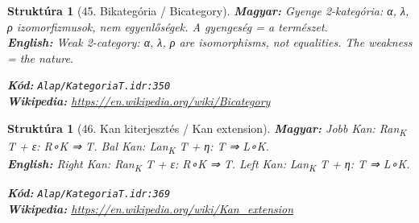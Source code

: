\documentclass[11pt,a4paper,twocolumn]{article}
\newtheorem{struktura}[tetel]{Struktúra}
\begin{document}
\begin{struktura}[45. Bikategória / Bicategory]

\textbf{Magyar:} Gyenge 2-kategória: α, λ, ρ izomorfizmusok, nem egyenlőségek. A gyengeség = a természet.\\

\textbf{English:} Weak 2-category: α, λ, ρ are isomorphisms, not equalities. The weakness = the nature.\\

\begin{center}
\end{center}

\textbf{Kód:} \texttt{Alap/KategoriaT.idr:350}\\
\textbf{Wikipedia:} \url{https://en.wikipedia.org/wiki/Bicategory}

\end{struktura}

\vspace{0.5cm}

\begin{struktura}[46. Kan kiterjesztés / Kan extension]

\textbf{Magyar:} Jobb Kan: Ran\textsubscript{K} T + ε: R∘K ⇒ T. Bal Kan: Lan\textsubscript{K} T + η: T ⇒ L∘K.\\

\textbf{English:} Right Kan: Ran\textsubscript{K} T + ε: R∘K ⇒ T. Left Kan: Lan\textsubscript{K} T + η: T ⇒ L∘K.\\

\begin{center}
\end{center}

\textbf{Kód:} \texttt{Alap/KategoriaT.idr:369}\\
\textbf{Wikipedia:} \url{https://en.wikipedia.org/wiki/Kan_extension}

\end{struktura}

\vspace{0.5cm}
\end{document}

